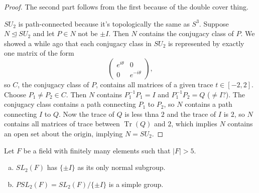 \documentclass[10pt]{scrartcl}
\providecommand{\ii}{\item}
\providecommand{\opname}{\operatorname}
\providecommand{\inv}{^{-1}}
\begin{document}
\begin{proof}
	The second part follows from the first because of the double cover thing.
	
	$SU_2$ is path-connected because it's topologically the same as $S^3$.
	Suppose $N\trianglelefteq SU_2$ and let $P\in N$ not be $\pm I$.
	Then $N$ contains the conjugacy class of $P$.
	We showed a while ago that each conjugacy class in $SU_2$
	is represented by exactly one matrix of the form
	\[\begin{pmatrix}
		e^{i\theta} & 0\\
		0 & e^{-i\theta}
	\end{pmatrix},\]
	so $C$, the conjugacy class of $P$, contains all matrices of a given trace
	$t\in[-2,2]$.
	Choose $P_1\ne P_2\in C$. Then $N$ contains $P_1\inv P_1 = I$
	and $P_1\inv P_2 = Q$ ($\ne I$?).
	The conjugacy class contains a path connecting $P_1$ to $P_2$,
	so $N$ contains a path connecting $I$ to $Q$.
	Now the trace of $Q$ is less thna $2$ and the trace of $I$ is $2$,
	so $N$ contains all matrices of trace between $\opname{Tr}(Q)$ and $2$,
	which implies $N$ contains an open set about the origin,
	implying $N = SU_2$.
\end{proof}

\begin{theorem}
	Let $F$ be a field with finitely many elements such that $|F| > 5$.
	\begin{enumerate}[(a)]
		\ii $SL_2(F)$ has $\{\pm I\}$ as its only normal subgroup.
		\ii $PSL_2(F) = SL_2(F)/\{\pm I\}$ is a simple group.
	\end{enumerate}
\end{theorem}
\end{document}
